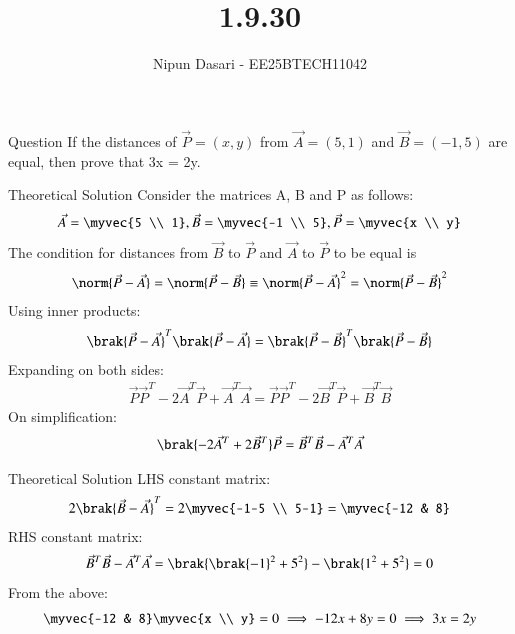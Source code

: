 \documentclass{beamer}
\title %
{1.9.30}
\author %
{Nipun Dasari - EE25BTECH11042}
\begin{document}
	
		\frame{\titlepage}
	\begin{frame}{Question}
		If the distances of $\vec{P} = (x, y)$ from $\vec{A} = (5, 1)$ and $\vec{B} = (−1, 5)$ are equal, then prove
		that 3x = 2y.
	\end{frame}

	
\begin{frame}{Theoretical Solution}
	Consider the matrices A, B and P as follows:
\begin{align*}
	\vec{A} = \myvec{5 \\ 1}, \vec{B} = \myvec{-1 \\ 5}, \vec{P}= \myvec{x \\ y}
\end{align*}
The condition for distances from $\vec{B}$ to $\vec{P}$ and $\vec{A}$ to $\vec{P}$ to be equal is
\begin{align*}
	\norm{\vec{P}-\vec{A}} = \norm{\vec{P}-\vec{B}} \equiv \norm{\vec{P}-\vec{A}}^2 = \norm{\vec{P}-\vec{B}}^2
\end{align*}
Using inner products:
\begin{align*}
	\brak{\vec{P}-\vec{A}}^{T}\brak{\vec{P}-\vec{A}} = \brak{\vec{P}-\vec{B}}^{T}\brak{\vec{P}-\vec{B}}
\end{align*}
Expanding on both sides:
\begin{align*}
	\vec{P}\vec{P}^{T} - 2\vec{A}^{T}\vec{P} + \vec{A}^{T}\vec{A} = \vec{P}\vec{P}^{T} - 2\vec{B}^{T}\vec{P} + \vec{B}^{T}\vec{B}
\end{align*}
On simplification:
\begin{align*}
	\brak{-2\vec{A}^{T} + 2\vec{B}^{T}}\vec{P} = \vec{B}^{T}\vec{B} - \vec{A}^{T}\vec{A}
\end{align*} 
\end{frame}
\begin{frame}{Theoretical Solution}
LHS constant matrix:
\begin{align*}
	2\brak{\vec{B}-\vec{A}}^{T} = 2\myvec{-1-5 \\ 5-1} = \myvec{-12 & 8}	
\end{align*}
RHS constant matrix:
\begin{align*}
	\vec{B}^{T}\vec{B} - \vec{A}^{T}\vec{A} = \brak{\brak{-1}^2 + 5^2} - \brak{1^2 + 5^2} = 0
\end{align*}
From the above:
\begin{align*}
	\myvec{-12 & 8}\myvec{x \\ y} = 0 \implies -12x + 8y = 0 \implies 3x = 2y
\end{align*}
	\end{frame}
	
\end{document}
